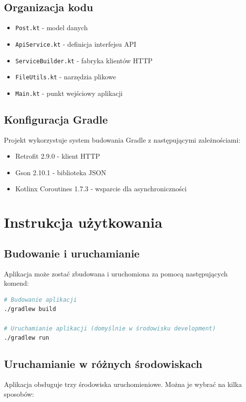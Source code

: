 \documentclass[12pt,a4paper]{article}
\begin{document}
\subsection{Organizacja kodu}
\begin{itemize}
    \item \texttt{Post.kt} - model danych
    \item \texttt{ApiService.kt} - definicja interfejsu API
    \item \texttt{ServiceBuilder.kt} - fabryka klientów HTTP
    \item \texttt{FileUtils.kt} - narzędzia plikowe
    \item \texttt{Main.kt} - punkt wejściowy aplikacji
\end{itemize}

\subsection{Konfiguracja Gradle}
Projekt wykorzystuje system budowania Gradle z następującymi zależnościami:
\begin{itemize}
    \item Retrofit 2.9.0 - klient HTTP 
    \item Gson 2.10.1 - biblioteka JSON
    \item Kotlinx Coroutines 1.7.3 - wsparcie dla asynchroniczności
\end{itemize}

\section{Instrukcja użytkowania}

\subsection{Budowanie i uruchamianie}
Aplikacja może zostać zbudowana i uruchomiona za pomocą następujących komend:
\begin{lstlisting}[language=bash]
# Budowanie aplikacji
./gradlew build

# Uruchamianie aplikacji (domyślnie w środowisku development)
./gradlew run
\end{lstlisting}

\subsection{Uruchamianie w różnych środowiskach}
Aplikacja obsługuje trzy środowiska uruchomieniowe. Można je wybrać na kilka sposobów:
\end{document}
